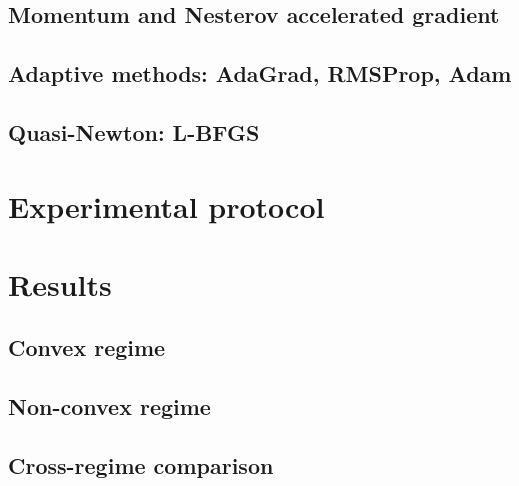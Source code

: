 \documentclass[11pt,a4paper]{article}
\begin{document}
\subsection{Momentum and Nesterov accelerated gradient}
\subsection{Adaptive methods: AdaGrad, RMSProp, Adam}
\subsection{Quasi-Newton: L-BFGS}

\section{Experimental protocol}

\section{Results}

\subsection{Convex regime}

\subsection{Non-convex regime}

\subsection{Cross-regime comparison}
\end{document}
